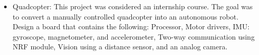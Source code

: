 \begin{cventries}
{\begin{cvitems}
\begin{itemize}[label= - ]
            \item{Quadcopter: This project was considered an internship course. The goal was to convert a manually controlled quadcopter into an autonomous robot. Design a board that contains the following: Processor, Motor drivers, IMU: gyroscope, magnetometer, and accelerometer, Two-way communication using NRF module, Vision using a distance sensor, and an analog camera.}
      \end{itemize}
  \end{cvitems}
}

\end{cventries}


